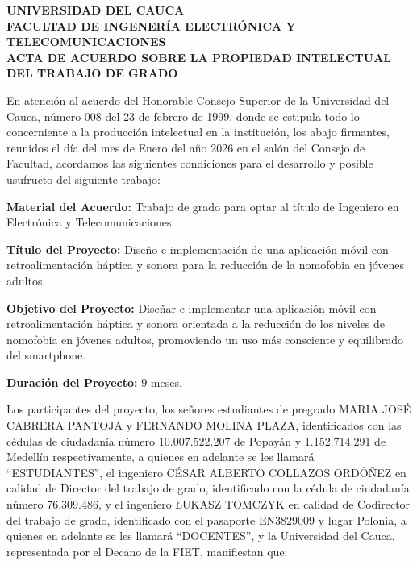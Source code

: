 \begin{center}
\bfseries UNIVERSIDAD DEL CAUCA \\ 
\vspace{0.3cm}
 FACULTAD DE INGENERÍA ELECTRÓNICA Y TELECOMUNICACIONES \\
 \vspace{0.3cm} 
 ACTA DE ACUERDO SOBRE LA PROPIEDAD INTELECTUAL DEL TRABAJO DE GRADO
\end{center}

En atención al acuerdo del Honorable Consejo Superior de la Universidad del Cauca, número 008 del 23 de febrero de 1999, donde se estipula todo lo concerniente a la producción intelectual en la institución, los abajo firmantes, reunidos el día del mes de  Enero del año 2026 en el salón del Consejo de Facultad, acordamos las siguientes condiciones para el desarrollo y posible usufructo del siguiente trabajo:

\textbf{Material del Acuerdo:} Trabajo de grado para optar al título de Ingeniero en Electrónica y Telecomunicaciones.

\textbf{Título del Proyecto:} Diseño e implementación de una aplicación móvil con retroalimentación háptica y sonora para la reducción de la nomofobia en jóvenes adultos.

\textbf{Objetivo del Proyecto:} Diseñar e implementar una aplicación móvil con retroalimentación háptica y sonora orientada a la reducción de los niveles de nomofobia en jóvenes adultos, promoviendo un uso más consciente y equilibrado del smartphone.

\textbf{Duración del Proyecto:} 9 meses.

Los participantes del proyecto, los señores estudiantes de pregrado MARIA JOSÉ CABRERA PANTOJA y FERNANDO MOLINA PLAZA, identificados con las cédulas de ciudadanía número 10.007.522.207 de Popayán y 1.152.714.291 de Medellín respectivamente, a quienes en adelante se les llamará “ESTUDIANTES”, el ingeniero CÉSAR ALBERTO COLLAZOS ORDÓÑEZ en calidad de Director del trabajo de grado, identificado con la cédula de ciudadanía número 76.309.486, y el ingeniero ŁUKASZ TOMCZYK en calidad de Codirector del trabajo de grado, identificado con el pasaporte EN3829009 y lugar Polonia, a quienes en adelante se les llamará “DOCENTES”, y la Universidad del Cauca, representada por el Decano de la FIET, manifiestan que:

